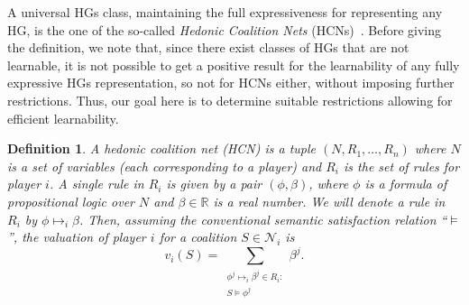\documentclass[letterpaper]{article} %
\newtheorem{definition}[theorem]{Definition}
\begin{document}
A universal HGs class, maintaining the full expressiveness for representing any HG, is the one of the so-called \emph{Hedonic Coalition Nets} (HCNs)~\cite{Elkind09}. Before giving the definition, we note that, since there exist classes of HGs that are not learnable, it is not possible to get a positive result for the learnability of any fully expressive HGs representation, so not for HCNs either, without imposing further restrictions. Thus, our goal here is to determine suitable restrictions allowing for efficient learnability.

\begin{definition}
A \emph{hedonic coalition net (HCN)} is a tuple $(N, R_1,\ldots, R_n)$ where $N$ is a set of \emph{variables} (each corresponding to a player) and $R_i$ is the set of \emph{rules} for player $i$. A single rule in $R_i$ is given by a pair $(\phi, \beta)$, where $\phi$ is a formula of propositional logic over $N$ and $\beta \in \mathbb{R}$ is a real number. We will denote a rule in $R_i$ by $\phi \mapsto_i \beta$. Then, assuming the conventional semantic satisfaction relation ``$\models$'', the valuation of player $i$ for a coalition $S \in \mathcal{N}_i$ is
\begin{equation}\label{eq:hcn}
    v_i(S) = \sum_{\substack{\phi^j \mapsto_i \beta^j \in R_i :\\ S \models \phi^j}} \beta^j .
\end{equation}
\end{definition}
\end{document}
